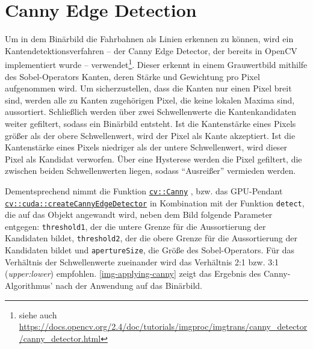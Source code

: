\documentclass[a4paper,12pt]{report}
\begin{document}
\section{Canny Edge Detection}
	Um in dem Binärbild die Fahrbahnen als Linien erkennen zu können, wird ein Kantendetektionsverfahren -- der Canny Edge Detector, der bereits in OpenCV implementiert wurde -- verwendet\footnote{siehe auch \url{https://docs.opencv.org/2.4/doc/tutorials/imgproc/imgtrans/canny\_detector/canny\_detector.html}}.
	Dieser erkennt in einem Grauwertbild mithilfe des Sobel-Operators Kanten, deren Stärke und Gewichtung pro Pixel aufgenommen wird.
	Um sicherzustellen, dass die Kanten nur einen Pixel breit sind, werden alle zu Kanten zugehörigen Pixel, die keine lokalen Maxima sind, aussortiert.
	Schließlich werden über zwei Schwellenwerte die Kantenkandidaten weiter gefiltert, sodass ein Binärbild entsteht.
	Ist die Kantenstärke eines Pixels größer als der obere Schwellenwert, wird der Pixel als Kante akzeptiert.
	Ist die Kantenstärke eines Pixels niedriger als der untere Schwellenwert, wird dieser Pixel als Kandidat verworfen.
	Über eine Hysterese werden die Pixel gefiltert, die zwischen beiden Schwellenwerten liegen, sodass "`Ausreißer"' vermieden werden.

	Dementsprechend nimmt die Funktion \href{https://docs.opencv.org/3.4.0/dd/d1a/group\_\_imgproc\_\_feature.html\#ga04723e007ed888ddf11d9ba04e2232de}{\texttt{cv::Canny}} \cite{opencv-doc}, bzw. das GPU-Pendant \href{https://docs.opencv.org/3.4.0/d0/d05/group\_\_cudaimgproc.html\#gabc17953de36faa404acb07dc587451fc}{\texttt{cv::cuda::createCannyEdgeDetector}} \cite{opencv-doc} in Kombination mit der Funktion \texttt{detect}, die auf das Objekt angewandt wird, neben dem Bild folgende Parameter entgegen: \texttt{threshold1}, der die untere Grenze für die Aussortierung der Kandidaten bildet, \texttt{threshold2}, der die obere Grenze für die Aussortierung der Kandidaten bildet und \texttt{apertureSize}, die Größe des Sobel-Operators.
	Für das Verhältnis der Schwellenwerte zueinander wird das Verhältnis 2:1 bzw. 3:1 (\textit{upper:lower}) empfohlen.
	\autoref{img-applying-canny} zeigt das Ergebnis des Canny-Algorithmus' nach der Anwendung auf das Binärbild.
\end{document}
